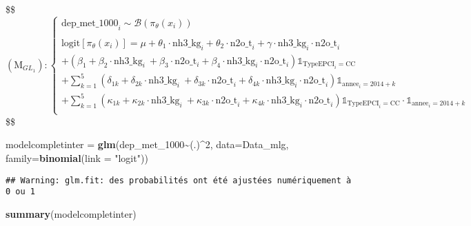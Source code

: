\documentclass[
]{article}
\newenvironment{Shaded}{\begin{snugshade}}{\end{snugshade}}
\newcommand{\AttributeTok}[1]{\textcolor[rgb]{0.13,0.29,0.53}{#1}}
\newcommand{\DecValTok}[1]{\textcolor[rgb]{0.00,0.00,0.81}{#1}}
\newcommand{\FunctionTok}[1]{\textcolor[rgb]{0.13,0.29,0.53}{\textbf{#1}}}
\newcommand{\NormalTok}[1]{#1}
\newcommand{\OtherTok}[1]{\textcolor[rgb]{0.56,0.35,0.01}{#1}}
\newcommand{\SpecialCharTok}[1]{\textcolor[rgb]{0.81,0.36,0.00}{\textbf{#1}}}
\newcommand{\StringTok}[1]{\textcolor[rgb]{0.31,0.60,0.02}{#1}}
\begin{document}
\$\$ \begin{equation*}
(\text{M}_{GL_{1}}) : 

\begin{cases}
\text{dep_met_1000}_i \sim \mathcal{B}(\pi_\theta(x_i)) \\

\\

\text{logit}[\pi_\theta(x_i)] = \mu  +  \theta_1\cdot\text{nh3_kg}_i  + \theta_2\cdot\text{n2o_t}_i  +  \gamma\cdot\text{nh3_kg}_i\cdot\text{n2o_t}_i  \\ 
  + (\beta_1  +  \beta_2\cdot\text{nh3_kg}_i ~ + \beta_3\cdot\text{n2o_t}_i + \beta_4\cdot\text{nh3_kg}_i\cdot\text{n2o_t}_i )\mathbb{1}_{\text{TypeEPCI}_i = \text{CC}} \\
  + \sum_{k=1}^5 (\delta_{1k}  +  \delta_{2k}\cdot\text{nh3_kg}_i ~ + \delta_{3k}\cdot\text{n2o_t}_i + \delta_{4k}\cdot\text{nh3_kg}_i\cdot\text{n2o_t}_i )\mathbb{1}_{\text{annee}_i = 2014 + k} \\
  + \sum_{k=1}^5 (\kappa_{1k}  +  \kappa_{2k}\cdot\text{nh3_kg}_i ~ + \kappa_{3k}\cdot\text{n2o_t}_i + \kappa_{4k}\cdot\text{nh3_kg}_i\cdot\text{n2o_t}_i)\mathbb{1}_{\text{TypeEPCI}_i = \text{CC}}\cdot\mathbb{1}_{\text{annee}_i = 2014 + k} \\

\end{cases}

\end{equation*} \$\$

\begin{Shaded}
\begin{Highlighting}[]
\NormalTok{modelcompletinter }\OtherTok{=} \FunctionTok{glm}\NormalTok{(dep\_met\_1000}\SpecialCharTok{\textasciitilde{}}\NormalTok{(.)}\SpecialCharTok{\^{}}\DecValTok{2}\NormalTok{, }\AttributeTok{data=}\NormalTok{Data\_mlg, }\AttributeTok{family=}\FunctionTok{binomial}\NormalTok{(}\AttributeTok{link =} \StringTok{"logit"}\NormalTok{))}
\end{Highlighting}
\end{Shaded}

\begin{verbatim}
## Warning: glm.fit: des probabilités ont été ajustées numériquement à 0 ou 1
\end{verbatim}

\begin{Shaded}
\begin{Highlighting}[]
\FunctionTok{summary}\NormalTok{(modelcompletinter)}
\end{Highlighting}
\end{Shaded}
\end{document}
